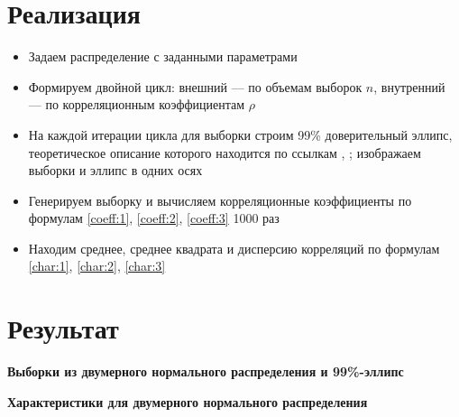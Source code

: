 \documentclass[12pt]{article}
\begin{document}
{\section*{Реализация}
\begin{itemize}
    \item Задаем распределение с заданными параметрами 
    \item Формируем двойной цикл: внешний –– по объемам выборок $n$, внутренний –– по корреляционным коэффициентам $\rho$
    \item На каждой итерации цикла для выборки строим 99\% доверительный эллипс, теоретическое описание которого находится по ссылкам \cite{ms_1}, \cite{ms_3}; изображаем выборки и эллипс в одних осях
    \item Генерируем выборку и вычисляем корреляционные коэффициенты по формулам \eqref{coeff:1}, \eqref{coeff:2}, \eqref{coeff:3} 1000 раз 
    \item Находим среднее, среднее квадрата и дисперсию корреляций по формулам \eqref{char:1}, \eqref{char:2}, \eqref{char:3}
\end{itemize}


\section*{Результат}

\textbf{Выборки из двумерного нормального распределения и 99\%-эллипс}

\vspace{10.cm}
\textbf{Характеристики для двумерного нормального распределения}\\



}
\end{document}
